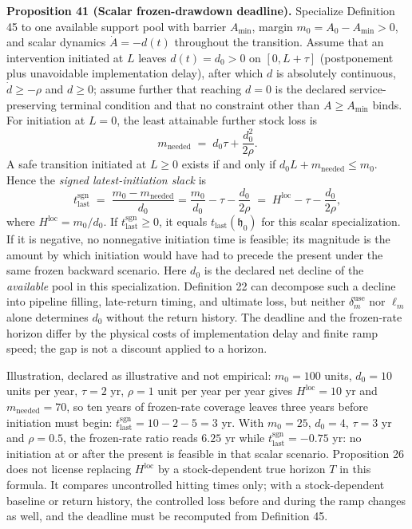 \documentclass[11pt]{article}
\begin{document}
\textbf{Proposition 41 (Scalar frozen-drawdown deadline).} Specialize Definition 45 to one available support pool with barrier \(A_{\min}\), margin \(m_0=A_0-A_{\min}>0\), and scalar dynamics \(\dot A=-d(t)\) throughout the transition. Assume that an intervention initiated at \(L\) leaves \(d(t)=d_0>0\) on \([0,L+\tau]\) (postponement plus unavoidable implementation delay), after which \(d\) is absolutely continuous, \(\dot d\ge-\rho\) and \(d\ge0\); assume further that reaching \(d=0\) is the declared service-preserving terminal condition and that no constraint other than \(A\ge A_{\min}\) binds. For initiation at \(L=0\), the least attainable further stock loss is
$$m_{\mathrm{needed}} \;=\; d_0\tau + \frac{d_0^{2}}{2\rho} .$$
A safe transition initiated at \(L\ge0\) exists if and only if \(d_0L+m_{\mathrm{needed}}\le m_0\). Hence the \emph{signed latest-initiation slack} is
$$t_{\mathrm{last}}^{\mathrm{sgn}} \;=\; \frac{m_0-m_{\mathrm{needed}}}{d_0}=\frac{m_0}{d_0} - \tau - \frac{d_0}{2\rho} \;=\; H^{\mathrm{loc}} - \tau - \frac{d_0}{2\rho} ,$$
where \(H^{\mathrm{loc}}=m_0/d_0\). If \(t_{\mathrm{last}}^{\mathrm{sgn}}\ge0\), it equals \(t_{\mathrm{last}}(\mathfrak h_0)\) for this scalar specialization. If it is negative, no nonnegative initiation time is feasible; its magnitude is the amount by which initiation would have had to precede the present under the same frozen backward scenario. Here \(d_0\) is the declared net decline of the \emph{available} pool in this specialization. Definition 22 can decompose such a decline into pipeline filling, late-return timing, and ultimate loss, but neither \(\delta_m^{\mathrm{use}}\) nor \(\ell_m\) alone determines \(d_0\) without the return history. The deadline and the frozen-rate horizon differ by the physical costs of implementation delay and finite ramp speed; the gap is not a discount applied to a horizon.

Illustration, declared as illustrative and not empirical: \(m_0 = 100\) units, \(d_0 = 10\) units per year, \(\tau = 2\) yr, \(\rho = 1\) unit per year per year gives \(H^{\mathrm{loc}} = 10\) yr and \(m_{\mathrm{needed}} = 70\), so ten years of frozen-rate coverage leaves three years before initiation must begin: \(t_{\mathrm{last}}^{\mathrm{sgn}} = 10 - 2 - 5 = 3\) yr. With \(m_0 = 25\), \(d_0 = 4\), \(\tau = 3\) yr and \(\rho = 0.5\), the frozen-rate ratio reads \(6.25\) yr while \(t_{\mathrm{last}}^{\mathrm{sgn}} = -0.75\) yr: no initiation at or after the present is feasible in that scalar scenario. Proposition 26 does not license replacing \(H^{\mathrm{loc}}\) by a stock-dependent true horizon \(T\) in this formula. It compares uncontrolled hitting times only; with a stock-dependent baseline or return history, the controlled loss before and during the ramp changes as well, and the deadline must be recomputed from Definition 45.
\end{document}
